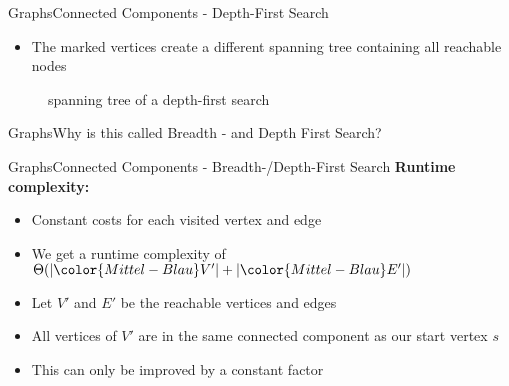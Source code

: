 
\begin{frame}{Graphs}{Connected Components - Depth-First Search}
  \begin{itemize}
    \item
      The marked vertices create a different spanning tree containing all
      reachable nodes
  \end{itemize}
  \begin{figure}
    \begin{adjustbox}{width=0.95\linewidth}
      
    \end{adjustbox}
    \caption{spanning tree of a depth-first search}
    \label{fig:graph:depth_first_search_spanning_tree}
  \end{figure}
\end{frame}

\begin{frame}{Graphs}{Why is this called Breadth - and Depth First Search?}
 
\end{frame}

\begin{frame}{Graphs}{Connected Components - Breadth-/Depth-First Search}
  \textbf{Runtime complexity:}
  \begin{itemize}
    \item<2->
      Constant costs for each visited vertex and edge
    \item<3->
      We get a runtime complexity of
      \begin{math}
        \Theta(\vert {\color{Mittel-Blau}V'} \vert
          + \vert {\color{Mittel-Blau}E'} \vert)
      \end{math}
    \item<4->
      Let {\color{Mittel-Blau}$V'$} and {\color{Mittel-Blau}$E'$} be the
      reachable vertices and edges
    \item<5->
      All vertices of {\color{Mittel-Blau}$V'$} are in the same connected
      component as our start vertex {\color{Mittel-Blau}$s$}
    \item<6->
      This can only be improved by a constant factor
  \end{itemize}
\end{frame}
